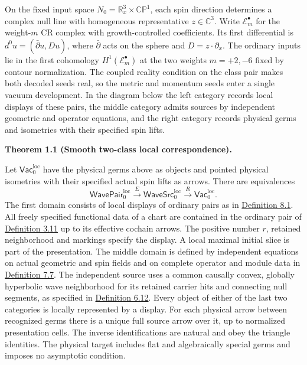 \documentclass[
  english,
  11pt,
  reqno]{amsart}
\makeatletter
\newcommand{\pandocstatementheading}[1]{%
  \par\if@nobreak\else
    \addpenalty{\@beginparpenalty}%
    \addvspace{.5\baselineskip plus .2\baselineskip minus .2\baselineskip}%
  \fi
  {\normalfont\bfseries #1\par}%
  \nobreak\@afterindenttrue\@afterheading
}
\makeatother
\begin{document}
On the fixed input space \(N_0=\mathbb R^3_x\times\mathbb{CP}^1\), each
spin direction determines a complex null line with homogeneous
representative \(z\in\mathbb C^3\). Write \(\mathscr E_m^\bullet\) for
the weight-\(m\) CR complex with growth-controlled coefficients. Its
first differential is \(d^0u=(\bar\partial u,Du)\), where
\(\bar\partial\) acts on the sphere and \(D=z\cdot\partial_x\). The
ordinary inputs lie in the first cohomology
\(H^1(\mathscr E_m^\bullet)\) at the two weights \(m=+2,-6\) fixed by
contour normalization. The coupled reality condition on the class pair
makes both decoded seeds real, so the metric and momentum seeds enter a
single vacuum development. In the diagram below the left category
records local displays of these pairs, the middle category admits
sources by independent geometric and operator equations, and the right
category records physical germs and isometries with their specified spin
lifts.

\pandocstatementheading{\leavevmode{}\label{thm:local-main-correspondence}Theorem 1.1 (Smooth two-class local correspondence).}

Let \(\mathsf{Vac}^{\mathrm{loc}}_0\) have the physical germs above as
objects and pointed physical isometries with their specified actual spin
lifts as arrows. There are equivalences%
 \[
\mathsf{WavePair}^{\mathrm{loc}}_0
\xrightarrow{\ E\ }
\mathsf{WaveSrc}^{\mathrm{loc}}_0
\xrightarrow{\ R\ }
\mathsf{Vac}^{\mathrm{loc}}_0 .
\] The first domain consists of local displays of ordinary pairs as in
\hyperref[def:local-display-groupoids]{Definition 8.1}. All freely
specified functional data of a chart are contained in the ordinary pair
of \hyperref[def:online-effective-ordinary-cochain-domain]{Definition
3.11} up to its effective cochain arrows. The positive number \(r\),
retained neighborhood and markings specify the display. A local maximal
initial slice is part of the presentation. The middle domain is defined
by independent equations on actual geometric and spin fields and on
complete operator and module data in
\hyperref[def:online-complete-independent-wave-source]{Definition 7.7}.
The independent source uses a common causally convex, globally
hyperbolic wave neighborhood for its retained carrier hits and
connecting null segments, as specified in
\hyperref[def:online-wave-carrier-displays]{Definition 6.12}. Every
object of either of the last two categories is locally represented by a
display. For each physical arrow between recognized germs there is a
unique full source arrow over it, up to normalized presentation cells.
The inverse identifications are natural and obey the triangle
identities. The physical target includes flat and algebraically special
germs and imposes no asymptotic condition.
\end{document}
